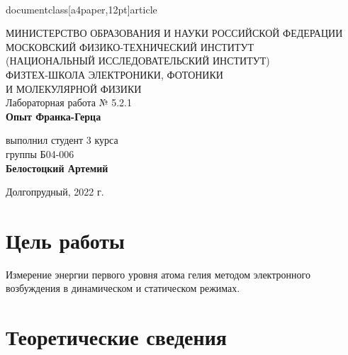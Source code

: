 \\documentclass[a4paper,12pt]{article}
\begin{document}
 

\begin{titlepage}
	\begin{center}
		\large 	МИНИСТЕРСТВО ОБРАЗОВАНИЯ И НАУКИ РОССИЙСКОЙ ФЕДЕРАЦИИ\\
				МОСКОВСКИЙ ФИЗИКО-ТЕХНИЧЕСКИЙ ИНСТИТУТ \\
				(НАЦИОНАЛЬНЫЙ ИССЛЕДОВАТЕЛЬСКИЙ ИНСТИТУТ)\\ 
				ФИЗТЕХ-ШКОЛА ЭЛЕКТРОНИКИ, ФОТОНИКИ \\
				И МОЛЕКУЛЯРНОЙ ФИЗИКИ \\
		
		
		\vspace{4.0 cm}
		Лабораторная работа № 5.2.1 \\ 
		\LARGE \textbf{Опыт Франка-Герца}
	\end{center}
	\vspace{3 cm} \large
	
	\begin{flushright}
		выполнил студент 3 курса \\
		{группы Б04-006}\\
		\textbf{Белостоцкий Артемий}\\
	\end{flushright}
	
	\vfill

	\begin{center}
	Долгопрудный, 2022 г.
	\end{center}
\end{titlepage}                                                                      


\section*{Цель работы}
	
Измерение энергии первого уровня атома гелия методом электронного возбуждения в динамическом и статическом режимах.

\section*{Теоретические сведения}
\end{document}
